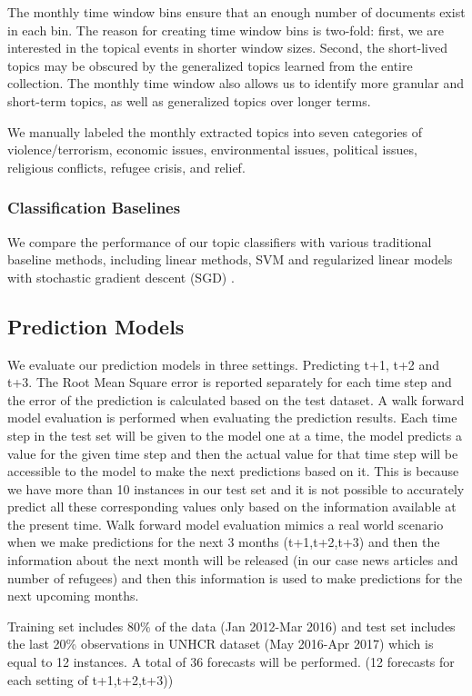 The monthly time window bins ensure that an enough number of documents exist in each bin. The reason for creating time window bins is two-fold: first, we are interested in the topical events in shorter window sizes. Second, the short-lived topics may be obscured by the generalized topics learned from the entire collection. The monthly time window also allows us to identify more granular and short-term topics, as well as generalized topics over longer terms. 

We manually labeled the monthly extracted topics into seven categories of violence/terrorism, economic issues, environmental issues, political issues, religious conflicts, refugee crisis, and relief.

\subsubsection{Classification Baselines}
We compare the performance of our topic classifiers with various traditional baseline methods, including linear methods, SVM and regularized linear models with stochastic gradient descent (SGD) \cite{bottou-2010}.

\subsection{Prediction Models}
We evaluate our prediction models in three settings. Predicting t+1, t+2 and t+3. The Root Mean Square error is reported separately for each time step and the error of the prediction is calculated based on the test dataset.
A walk forward model evaluation is performed when evaluating the prediction results. Each time step in the test set will be given to the model one at a time, the model predicts a value for the given time step and then the actual value for that time step will be accessible to the model to make the next predictions based on it. This is because we have more than 10 instances in our test set and it is not possible to accurately predict all these corresponding values only based on the information available at the present time. Walk forward model evaluation mimics a real world scenario when we make predictions for the next 3 months (t+1,t+2,t+3) and then the information about the next month will be released (in our case news articles and number of refugees) and then this information is used to make predictions for the next upcoming months. 

Training set includes $80\%$ of the data (Jan 2012-Mar 2016) and test set includes the last 20\% observations in UNHCR dataset (May 2016-Apr 2017) which is equal to 12 instances. A total of 36 forecasts will be performed. (12 forecasts for each setting of t+1,t+2,t+3))

